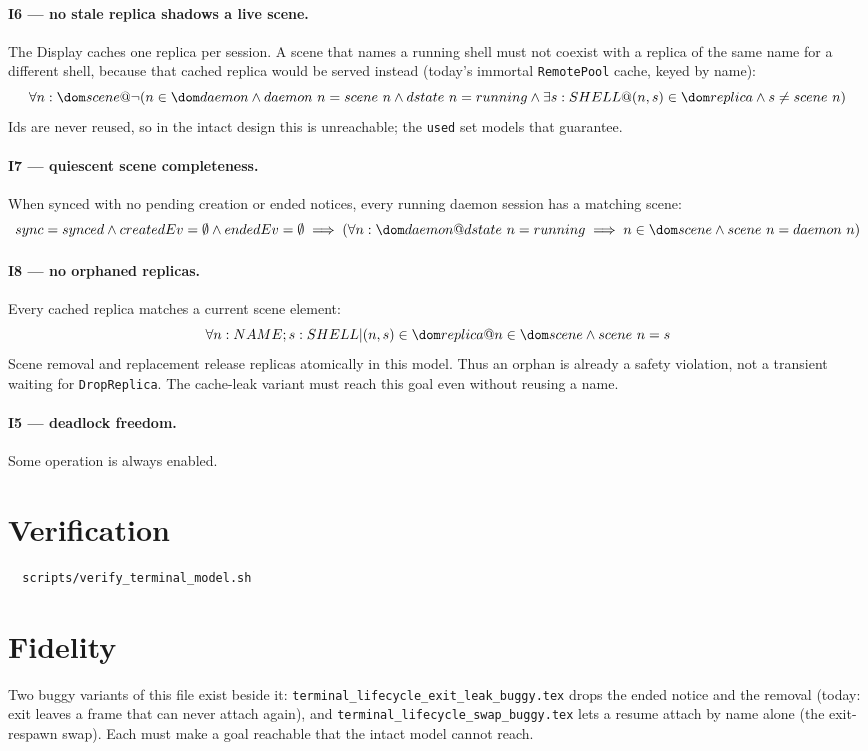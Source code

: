 \documentclass[a4paper,10pt,fleqn]{article}
\begin{document}
\paragraph{I6 --- no stale replica shadows a live scene.}
The Display caches one replica per session.  A scene that names a running
shell must not coexist with a replica of the same name for a different
shell, because that cached replica would be served instead (today's
immortal \texttt{RemotePool} cache, keyed by name):
\[
  \forall n : \dom scene @ \lnot (n \in \dom daemon \land
    daemon~n = scene~n \land dstate~n = running \land
    \exists s : SHELL @ (n , s) \in \dom replica \land s \neq scene~n)
\]
Ids are never reused, so in the intact design this is unreachable; the
\texttt{used} set models that guarantee.

\paragraph{I7 --- quiescent scene completeness.}
When synced with no pending creation or ended notices, every running daemon
session has a matching scene:
\[
  sync = synced \land createdEv = \emptyset \land endedEv = \emptyset
  \implies (\forall n : \dom daemon @ dstate~n = running \implies
    n \in \dom scene \land scene~n = daemon~n)
\]

\paragraph{I8 --- no orphaned replicas.}
Every cached replica matches a current scene element:
\[
  \forall n : NAME; s : SHELL | (n , s) \in \dom replica @
    n \in \dom scene \land scene~n = s
\]
Scene removal and replacement release replicas atomically in this model.
Thus an orphan is already a safety violation, not a transient waiting for
\texttt{DropReplica}. The cache-leak variant must reach this goal even
without reusing a name.

\paragraph{I5 --- deadlock freedom.}
Some operation is always enabled.

\section{Verification}
\label{sec:verify}

\begin{verbatim}
  scripts/verify_terminal_model.sh
\end{verbatim}

\section{Fidelity}

Two buggy variants of this file exist beside it:
\texttt{terminal\_lifecycle\_exit\_leak\_buggy.tex} drops the ended
notice and the removal (today: exit leaves a frame that can never attach
again), and \texttt{terminal\_lifecycle\_swap\_buggy.tex} lets a resume
attach by name alone (the exit-respawn swap).  Each must make a goal
reachable that the intact model cannot reach.
\end{document}
